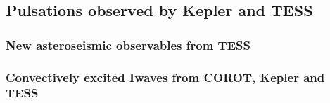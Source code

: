 {\color{blue}
\subsection{Pulsations observed by Kepler and TESS}


\subsubsection{New asteroseismic observables from TESS}

\subsubsection{Convectively excited Iwaves from COROT, Kepler and TESS}


}
